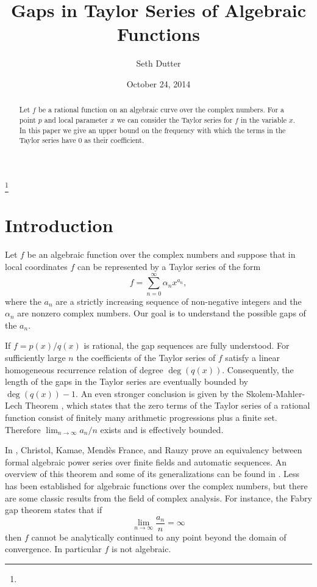 \documentclass{amsart}
\theoremstyle{definition}
\theoremstyle{remark}
\numberwithin{equation}{section}
\begin{document}
\title{Gaps in Taylor Series of Algebraic Functions}

\author{Seth Dutter}
\address{University of Wisconsin - Stout\\
Menomonie, WI}
\curraddr{}
\thanks{}

\date{October 24, 2014}



\begin{abstract}
Let $f$ be a rational function on an algebraic curve over the complex numbers. For a point $p$ and local parameter $x$ we can consider the Taylor series for $f$ in the variable $x$. In this paper we give an upper bound on the frequency with which the terms in the Taylor series have $0$ as their coefficient.
\end{abstract}

\maketitle

\section{Introduction}\label{section.intro}

Let $f$ be an algebraic function over the complex numbers and suppose that in local coordinates $f$ can be represented by a Taylor series of the form
\[
f = \sum_{n=0}^\infty \alpha_n x^{a_n},
\]
where the $a_n$ are a strictly increasing sequence of non-negative integers and the $\alpha_n$ are nonzero complex numbers. Our goal is to understand the possible gaps of the $a_n$.

If $f=p(x)/q(x)$ is rational, the gap sequences are fully understood. For sufficiently large $n$ the coefficients of the Taylor series of $f$ satisfy a linear homogeneous recurrence relation of degree $\deg(q(x))$. Consequently, the length of the gaps in the Taylor series are eventually bounded by $\deg(q(x))-1$. An even stronger conclusion is given by the Skolem-Mahler-Lech Theorem \cite{mahler56}, which states that the zero terms of the Taylor series of a rational function consist of finitely many arithmetic progressions plus a finite set. Therefore $\lim_{n\rightarrow\infty}a_n/n$ exists and is effectively bounded.

In \cite{Christol1980}, Christol, Kamae, Mend\`{e}s France, and Rauzy prove an equivalency between formal algebraic power series over finite fields and automatic sequences. An overview of this theorem and some of its generalizations can be found in \cite{denef87}. Less has been established for algebraic functions over the complex numbers, but there are some classic results from the field of complex analysis. For instance, the Fabry gap theorem \cite{fabry96} states that if
\[
\lim_{n\rightarrow\infty} \frac{a_n}{n} = \infty
\]
then $f$ cannot be analytically continued to any point beyond the domain of convergence. In particular $f$ is not algebraic.
\end{document}
